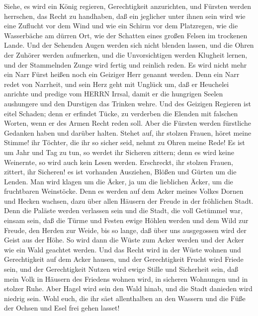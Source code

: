  Siehe, es wird ein König regieren, Gerechtigkeit
anzurichten, und Fürsten werden herrschen, das Recht zu handhaben,
 daß ein jeglicher unter ihnen sein wird wie eine Zuflucht
vor dem Wind und wie ein Schirm vor dem Platzregen, wie die Wasserbäche
am dürren Ort, wie der Schatten eines großen Felsen im trockenen Lande.
 Und der Sehenden Augen werden sich nicht blenden lassen,
und die Ohren der Zuhörer werden aufmerken,  und die
Unvorsichtigen werden Klugheit lernen, und der Stammelnden Zunge wird
fertig und reinlich reden.  Es wird nicht mehr ein Narr
Fürst heißen noch ein Geiziger Herr genannt werden.  Denn
ein Narr redet von Narrheit, und sein Herz geht mit Unglück um, daß er
Heuchelei anrichte und predige vom HERRN Irrsal, damit er die hungrigen
Seelen aushungere und den Durstigen das Trinken wehre.  Und
des Geizigen Regieren ist eitel Schaden; denn er erfindet Tücke, zu
verderben die Elenden mit falschen Worten, wenn er des Armen Recht reden
soll.  Aber die Fürsten werden fürstliche Gedanken haben und
darüber halten.  Stehet auf, ihr stolzen Frauen, höret meine
Stimme! ihr Töchter, die ihr so sicher seid, nehmt zu Ohren meine Rede!
 Es ist um Jahr und Tag zu tun, so werdet ihr Sicheren
zittern; denn es wird keine Weinernte, so wird auch kein Lesen werden.
 Erschreckt, ihr stolzen Frauen, zittert, ihr Sicheren! es
ist vorhanden Ausziehen, Blößen und Gürten um die Lenden. 
Man wird klagen um die Äcker, ja um die lieblichen Äcker, um die
fruchtbaren Weinstöcke.  Denn es werden auf dem Acker
meines Volkes Dornen und Hecken wachsen, dazu über allen Häusern der
Freude in der fröhlichen Stadt.  Denn die Paläste werden
verlassen sein und die Stadt, die voll Getümmel war, einsam sein, daß
die Türme und Festen ewige Höhlen werden und dem Wild zur Freude, den
Herden zur Weide,  bis so lange, daß über uns ausgegossen
wird der Geist aus der Höhe. So wird dann die Wüste zum Acker werden und
der Acker wie ein Wald geachtet werden.  Und das Recht wird
in der Wüste wohnen und Gerechtigkeit auf dem Acker hausen,
 und der Gerechtigkeit Frucht wird Friede sein, und der
Gerechtigkeit Nutzen wird ewige Stille und Sicherheit sein,
 daß mein Volk in Häusern des Friedens wohnen wird, in
sicheren Wohnungen und in stolzer Ruhe.  Aber Hagel wird
sein den Wald hinab, und die Stadt danieden wird niedrig sein.
 Wohl euch, die ihr säet allenthalben an den Wassern und
die Füße der Ochsen und Esel frei gehen lasset!

